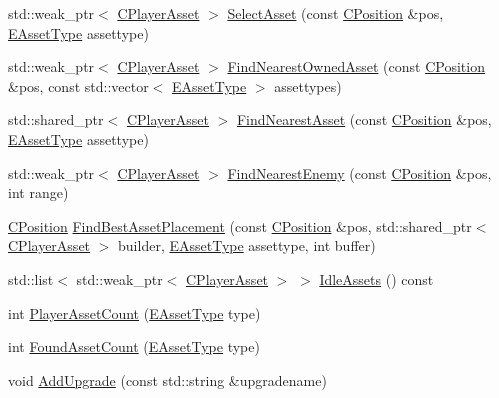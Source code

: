 \begin{DoxyCompactItemize}
\item 
std\+::weak\+\_\+ptr$<$ \hyperlink{classCPlayerAsset}{C\+Player\+Asset} $>$ \hyperlink{classCPlayerData_a1c926b101513f871ec85e34ac3c83ec4}{Select\+Asset} (const \hyperlink{classCPosition}{C\+Position} \&pos, \hyperlink{GameDataTypes_8h_a5600d4fc433b83300308921974477fec}{E\+Asset\+Type} assettype)
\item 
std\+::weak\+\_\+ptr$<$ \hyperlink{classCPlayerAsset}{C\+Player\+Asset} $>$ \hyperlink{classCPlayerData_a53c9e046c6f43fd83a0feb32b4fe999d}{Find\+Nearest\+Owned\+Asset} (const \hyperlink{classCPosition}{C\+Position} \&pos, const std\+::vector$<$ \hyperlink{GameDataTypes_8h_a5600d4fc433b83300308921974477fec}{E\+Asset\+Type} $>$ assettypes)
\item 
std\+::shared\+\_\+ptr$<$ \hyperlink{classCPlayerAsset}{C\+Player\+Asset} $>$ \hyperlink{classCPlayerData_a5f70ad16e9b4e8aa9edc6e8fc4136527}{Find\+Nearest\+Asset} (const \hyperlink{classCPosition}{C\+Position} \&pos, \hyperlink{GameDataTypes_8h_a5600d4fc433b83300308921974477fec}{E\+Asset\+Type} assettype)
\item 
std\+::weak\+\_\+ptr$<$ \hyperlink{classCPlayerAsset}{C\+Player\+Asset} $>$ \hyperlink{classCPlayerData_a5f0a1280933f7bb9a65ab256ecff1a69}{Find\+Nearest\+Enemy} (const \hyperlink{classCPosition}{C\+Position} \&pos, int range)
\item 
\hyperlink{classCPosition}{C\+Position} \hyperlink{classCPlayerData_ac43ee660aa07b2d9d96eb5285d50fab5}{Find\+Best\+Asset\+Placement} (const \hyperlink{classCPosition}{C\+Position} \&pos, std\+::shared\+\_\+ptr$<$ \hyperlink{classCPlayerAsset}{C\+Player\+Asset} $>$ builder, \hyperlink{GameDataTypes_8h_a5600d4fc433b83300308921974477fec}{E\+Asset\+Type} assettype, int buffer)
\item 
std\+::list$<$ std\+::weak\+\_\+ptr$<$ \hyperlink{classCPlayerAsset}{C\+Player\+Asset} $>$ $>$ \hyperlink{classCPlayerData_a5bd2ebe2e3dc25669bb312226e087fd1}{Idle\+Assets} () const
\item 
int \hyperlink{classCPlayerData_a3fe55bd902f7a819c0689825d8ad3e4c}{Player\+Asset\+Count} (\hyperlink{GameDataTypes_8h_a5600d4fc433b83300308921974477fec}{E\+Asset\+Type} type)
\item 
int \hyperlink{classCPlayerData_ac81c0899651bf3f9962b03ef0d7a2415}{Found\+Asset\+Count} (\hyperlink{GameDataTypes_8h_a5600d4fc433b83300308921974477fec}{E\+Asset\+Type} type)
\item 
void \hyperlink{classCPlayerData_ae66fe7d594267990adf34f9286925efb}{Add\+Upgrade} (const std\+::string \&upgradename)

\end{DoxyCompactItemize}
